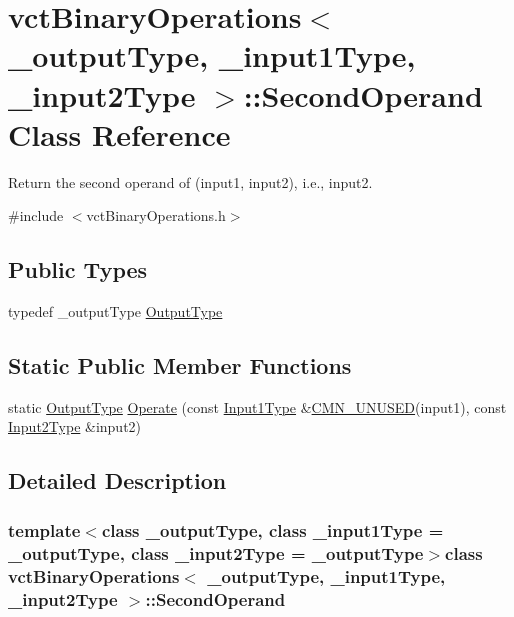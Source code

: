 \hypertarget{classvct_binary_operations_1_1_second_operand}{}\section{vct\+Binary\+Operations$<$ \+\_\+output\+Type, \+\_\+input1\+Type, \+\_\+input2\+Type $>$\+:\+:Second\+Operand Class Reference}
\label{classvct_binary_operations_1_1_second_operand}


Return the second operand of (input1, input2), i.\+e., input2.  




{\ttfamily \#include $<$vct\+Binary\+Operations.\+h$>$}

\subsection*{Public Types}
\begin{DoxyCompactItemize}
\item 
typedef \+\_\+output\+Type \hyperlink{classvct_binary_operations_1_1_second_operand_acc7e6d4248e776359bcefe27a2ea9f53}{Output\+Type}
\end{DoxyCompactItemize}
\subsection*{Static Public Member Functions}
\begin{DoxyCompactItemize}
\item 
static \hyperlink{classvct_binary_operations_1_1_second_operand_acc7e6d4248e776359bcefe27a2ea9f53}{Output\+Type} \hyperlink{classvct_binary_operations_1_1_second_operand_a0de9cd948a8e946006c19fea34be7a90}{Operate} (const \hyperlink{classvct_binary_operations_a5e56a66a012d6a28c539a08a0021c45e}{Input1\+Type} \&\hyperlink{cmn_portability_8h_a021894e2626935fa2305434b1e893ff6}{C\+M\+N\+\_\+\+U\+N\+U\+S\+E\+D}(input1), const \hyperlink{classvct_binary_operations_a929119af557a04a16b4d854981e49e1b}{Input2\+Type} \&input2)
\end{DoxyCompactItemize}


\subsection{Detailed Description}
\subsubsection*{template$<$class \+\_\+output\+Type, class \+\_\+input1\+Type = \+\_\+output\+Type, class \+\_\+input2\+Type = \+\_\+output\+Type$>$class vct\+Binary\+Operations$<$ \+\_\+output\+Type, \+\_\+input1\+Type, \+\_\+input2\+Type $>$\+::\+Second\+Operand}

